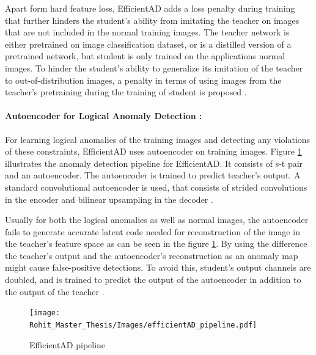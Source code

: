 Apart form hard feature loss, EfficientAD adds a loss penalty during training that further hinders the student's ability from imitating the teacher on images that are not included in the normal training images. The teacher network is either pretrained on image classification dataset, or is a distilled version of a pretrained network, but student is only trained on the applications normal images. To hinder the student's ability to generalize its imitation of the teacher to out-of-distribution images, a penalty in terms of using images from the teacher's pretraining during the training of student is proposed \cite{batzner2024efficientadaccuratevisualanomaly}.

\paragraph*{Autoencoder for Logical Anomaly Detection :}

For learning logical anomalies of the training images and detecting any violations of these constraints, EfficientAD uses autoencoder on training images. Figure \ref{fig:EfficientAD pipeline} illustrates the anomaly detection pipeline for EfficientAD. It consists of \gls{s-t} pair and an autoencoder. The autoencoder is trained to predict teacher's output. A standard convolutional autoencoder is used, that consists of strided convolutions in the encoder and bilinear upsampling in the decoder \cite{batzner2024efficientadaccuratevisualanomaly}.

Usually for both the logical anomalies as well as normal images, the autoencoder fails to generate accurate latent code needed for reconstruction of the image in the teacher's feature space as can be seen in the figure \ref{fig:EfficientAD pipeline}. By using the difference the teacher's output and the autoencoder's reconstruction as an anomaly map might cause false-positive detections. To avoid this, student's output channels are doubled, and is trained to predict the output of the autoencoder in addition to the output of the teacher \cite{batzner2024efficientadaccuratevisualanomaly}.

\begin{figure}[ht!]
    \centering
    \texttt{[image: Rohit\_Master\_Thesis/Images/efficientAD\_pipeline.pdf]}
    \caption{EfficientAD pipeline}
    \label{fig:EfficientAD pipeline}
\end{figure}

